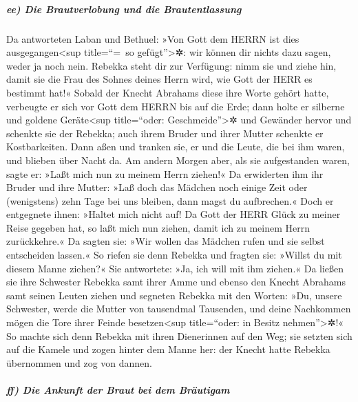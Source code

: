 \hypertarget{ee-die-brautverlobung-und-die-brautentlassung}{%
\subparagraph{ee) Die Brautverlobung und die
Brautentlassung}\label{ee-die-brautverlobung-und-die-brautentlassung}}

 Da antworteten Laban und Bethuel: »Von Gott dem HERRN
ist dies ausgegangen\textless sup title=``=~so gefügt''\textgreater✲:
wir können dir nichts dazu sagen, weder ja noch nein. 
Rebekka steht dir zur Verfügung: nimm sie und ziehe hin, damit sie die
Frau des Sohnes deines Herrn wird, wie Gott der HERR es bestimmt hat!«
 Sobald der Knecht Abrahams diese ihre Worte gehört
hatte, verbeugte er sich vor Gott dem HERRN bis auf die Erde;
 dann holte er silberne und goldene Geräte\textless sup
title=``oder: Geschmeide''\textgreater✲ und Gewänder hervor und schenkte
sie der Rebekka; auch ihrem Bruder und ihrer Mutter schenkte er
Kostbarkeiten.  Dann aßen und tranken sie, er und die
Leute, die bei ihm waren, und blieben über Nacht da. Am andern Morgen
aber, als sie aufgestanden waren, sagte er: »Laßt mich nun zu meinem
Herrn ziehen!«  Da erwiderten ihm ihr Bruder und ihre
Mutter: »Laß doch das Mädchen noch einige Zeit oder (wenigstens) zehn
Tage bei uns bleiben, dann magst du aufbrechen.«  Doch er
entgegnete ihnen: »Haltet mich nicht auf! Da Gott der HERR Glück zu
meiner Reise gegeben hat, so laßt mich nun ziehen, damit ich zu meinem
Herrn zurückkehre.«  Da sagten sie: »Wir wollen das
Mädchen rufen und sie selbst entscheiden lassen.«  So
riefen sie denn Rebekka und fragten sie: »Willst du mit diesem Manne
ziehen?« Sie antwortete: »Ja, ich will mit ihm ziehen.« 
Da ließen sie ihre Schwester Rebekka samt ihrer Amme und ebenso den
Knecht Abrahams samt seinen Leuten ziehen  und segneten
Rebekka mit den Worten: »Du, unsere Schwester, werde die Mutter von
tausendmal Tausenden, und deine Nachkommen mögen die Tore ihrer Feinde
besetzen\textless sup title=``oder: in Besitz nehmen''\textgreater✲!«
 So machte sich denn Rebekka mit ihren Dienerinnen auf
den Weg; sie setzten sich auf die Kamele und zogen hinter dem Manne her:
der Knecht hatte Rebekka übernommen und zog von dannen.

\hypertarget{ff-die-ankunft-der-braut-bei-dem-bruxe4utigam}{%
\subparagraph{ff) Die Ankunft der Braut bei dem
Bräutigam}\label{ff-die-ankunft-der-braut-bei-dem-bruxe4utigam}}

